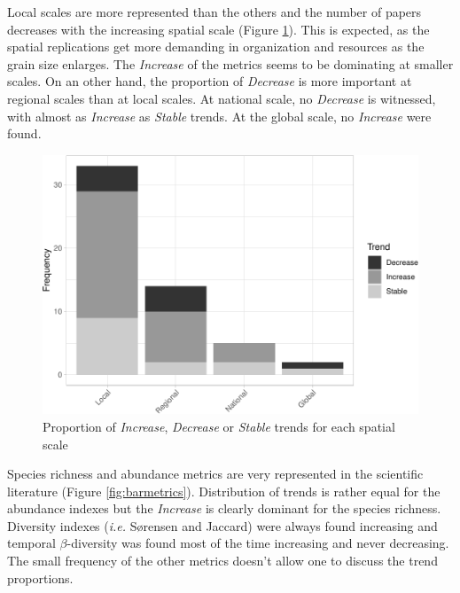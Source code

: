 \documentclass[
  12pt,
  oneside]{report}
\begin{document}
Local scales are more represented than the others and the number of papers decreases with the increasing spatial scale (Figure \ref{fig:barspatscale}). This is expected, as the spatial replications get more demanding in organization and resources as the grain size enlarges. The \emph{Increase} of the metrics seems to be dominating at smaller scales. On an other hand, the proportion of \emph{Decrease} is more important at regional scales than at local scales. At national scale, no \emph{Decrease} is witnessed, with almost as \emph{Increase} as \emph{Stable} trends. At the global scale, no \emph{Increase} were found.

\begin{figure}
\centering
\includegraphics{literature_review_files/figure-latex/barspatscale-1.pdf}
\caption{\label{fig:barspatscale}Proportion of \emph{Increase}, \emph{Decrease} or \emph{Stable} trends for each spatial scale}
\end{figure}

Species richness and abundance metrics are very represented in the scientific literature (Figure \ref{fig:barmetrics}). Distribution of trends is rather equal for the abundance indexes but the \emph{Increase} is clearly dominant for the species richness. Diversity indexes (\emph{i.e.} Sørensen and Jaccard) were always found increasing and temporal \(\beta\)-diversity was found most of the time increasing and never decreasing. The small frequency of the other metrics doesn't allow one to discuss the trend proportions.
\end{document}
